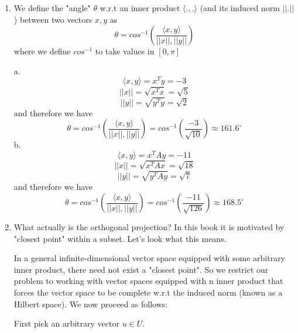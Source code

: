 \documentclass{article}
\newcommand{\chapternumber}{3}
\newenvironment{QandA}{\begin{enumerate}[label=\chapternumber.\arabic*]\bfseries\boldmath}
	{\end{enumerate}}
\newenvironment{answered}{\par\bigskip\normalfont\unboldmath}{}
\begin{document}
\begin{QandA}
		\item
		\begin{answered}
			We define the "angle" $\theta$ w.r.t an inner product $\langle .,. \rangle$ (and its induced norm $||.||$) between two vectors $x,y$ as
			\[\theta = cos^{-1}\left(\frac{\langle x,y \rangle}{||x||,||y||}\right)\]
			where we define $cos^{-1}$ to take values in $[0,\pi]$
			
			a. 
			\[\langle x,y \rangle = x^Ty = -3\]
			\[||x|| = \sqrt{x^Tx} = \sqrt{5}\]
			\[||y|| = \sqrt{y^Ty} = \sqrt{2}\]
			and therefore we have
			\[\theta = cos^{-1}\left(\frac{\langle x,y \rangle}{||x||,||y||}\right) = cos^{-1}\left(\frac{-3}{\sqrt{10}}\right)\approx 161.6^\circ\]
			b.
			\[\langle x,y \rangle = x^TAy = -11\]
			\[||x|| = \sqrt{x^TAx} = \sqrt{18}\]
			\[||y|| = \sqrt{y^TAy} = \sqrt{7}\]
			and therefore we have
			\[\theta = cos^{-1}\left(\frac{\langle x,y \rangle}{||x||,||y||}\right) = cos^{-1}\left(\frac{-11}{\sqrt{126}}\right)\approx 168.5^\circ\]
		\end{answered}
		
		\item
		\begin{answered}
			What actually is the orthogonal projection? In this book it is motivated by "closest point" within a subset. Let's look what this means.
			
			In a general infinite-dimensional vector space equipped with some arbitrary inner product, there need not exist a "closest point". So we restrict our problem to working with vector spaces equipped with n inner product that forces the vector space to be complete w.r.t the induced norm (known as a Hilbert space). We now proceed as follows:
			
			First pick an arbitrary vector $u\in U$.
			
			
			
		\end{answered}
	\end{QandA}
\end{document}
